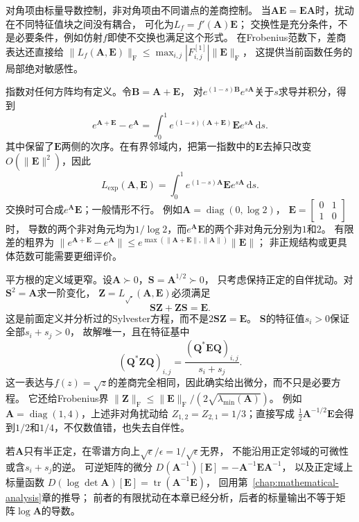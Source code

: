对角项由标量导数控制，非对角项由不同谱点的差商控制。
当$\bm A\bm E=\bm E\bm A$时，扰动在不同特征值块之间没有耦合，
可化为$L_f=f'(\bm A)\bm E$；
交换性是充分条件，不是必要条件，例如仿射$f$即使不交换也满足这个形式。
在Frobenius范数下，差商表达还直接给
$\lVert L_f(\bm A,\bm E)\rVert_{\mathrm F}
\leq\max_{i,j}|F^{[1]}_{i,j}|\lVert\bm E\rVert_{\mathrm F}$，
这提供当前函数任务的局部绝对敏感性。

指数对任何方阵均有定义。令$\bm B=\bm A+\bm E$，
对$e^{(1-s)\bm B}e^{s\bm A}$关于$s$求导并积分，得到
\[
 e^{\bm A+\bm E}-e^{\bm A}
 =\int_0^1e^{(1-s)(\bm A+\bm E)}\bm E e^{s\bm A}\,\mathrm ds.
\]
其中保留了$\bm E$两侧的次序。在有界邻域内，把第一指数中的$\bm E$去掉只改变
$O(\lVert\bm E\rVert^2)$，因此
\begin{equation}
 L_{\exp}(\bm A,\bm E)
 =\int_0^1e^{(1-s)\bm A}\bm E e^{s\bm A}\,\mathrm ds.
 \label{eq:matrix-analysis-exponential-frechet-derivative}
\end{equation}
交换时可合成$e^{\bm A}\bm E$；一般情形不行。
例如$\bm A=\operatorname{diag}(0,\log2)$，
$\bm E=\left[\begin{smallmatrix}0&1\\1&0\end{smallmatrix}\right]$时，
导数的两个非对角元均为$1/\log2$，而$e^{\bm A}\bm E$的两个非对角元分别为$1$和$2$。
有限差的粗界为
$\lVert e^{\bm A+\bm E}-e^{\bm A}\rVert
\leq e^{\max(\lVert\bm A+\bm E\rVert,\lVert\bm A\rVert)}\lVert\bm E\rVert$；
非正规结构或更具体范数可能需要更细评价。

平方根的定义域更窄。设$\bm A\succ0$，$\bm S=\bm A^{1/2}\succ0$，
只考虑保持正定的自伴扰动。对$\bm S^2=\bm A$求一阶变化，
$\bm Z=L_{\sqrt{\cdot}}(\bm A,\bm E)$必须满足
\[
 \bm S\bm Z+\bm Z\bm S=\bm E.
\]
这是前面定义并分析过的Sylvester方程，而不是$2\bm S\bm Z=\bm E$。
$\bm S$的特征值$s_i>0$保证全部$s_i+s_j>0$，
故解唯一，且在特征基中
\[
 (\bm Q^*\bm Z\bm Q)_{i,j}
 =\frac{(\bm Q^*\bm E\bm Q)_{i,j}}{s_i+s_j}.
\]
这一表达与$f(z)=\sqrt z$的差商完全相同，因此确实给出微分，而不只是必要方程。
它还给Frobenius界
$\lVert\bm Z\rVert_{\mathrm F}
\leq\lVert\bm E\rVert_{\mathrm F}/(2\sqrt{\lambda_{\min}(\bm A)})$。
例如$\bm A=\operatorname{diag}(1,4)$，上述非对角扰动给
$Z_{1,2}=Z_{2,1}=1/3$；直接写成
$\tfrac12\bm A^{-1/2}\bm E$会得到$1/2$和$1/4$，不仅数值错，也失去自伴性。

若$\bm A$只有半正定，在零谱方向上$\sqrt\epsilon/\epsilon=1/\sqrt\epsilon$无界，
不能沿用正定邻域的可微性或含$s_i+s_j$的逆。
可逆矩阵的微分
$D(\bm A^{-1})[\bm E]=-\bm A^{-1}\bm E\bm A^{-1}$，
以及正定域上标量函数
$D(\log\det\bm A)[\bm E]=\operatorname{tr}(\bm A^{-1}\bm E)$，
回用第~\ref{chap:mathematical-analysis}章的推导；
前者的有限扰动在本章已经分析，后者的标量输出不等于矩阵$\log\bm A$的导数。


